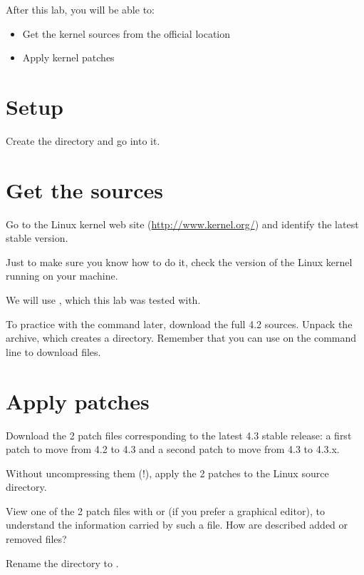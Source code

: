 
After this lab, you will be able to:
\begin{itemize}
\item Get the kernel sources from the official location
\item Apply kernel patches
\end{itemize}

\section{Setup}

Create the  directory and go into it.

\section{Get the sources}

Go to the Linux kernel web site (\url{http://www.kernel.org/}) and
identify the latest stable version.

Just to make sure you know how to do it, check the version of the
Linux kernel running on your machine.

We will use , which this lab was tested with.

To practice with the  command later, download the full 4.2
sources. Unpack the archive, which creates a 
directory. Remember that you can use  on the command
line to download files.

\section{Apply patches}

Download the 2 patch files corresponding to the latest 4.3 stable
release: a first patch to move from 4.2 to 4.3 and a second patch to
move from 4.3 to 4.3.x.

Without uncompressing them (!), apply the 2 patches to the Linux
source directory.

View one of the 2 patch files with  or 
(if you prefer a graphical editor), to understand the information carried
by such a file. How are described added or removed files?

Rename the  directory to .
